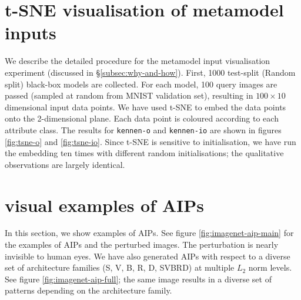 \documentclass{article} %
\newcommand{\OR}{\texttt{kennen-o}\xspace}
\newcommand{\ORIC}{\texttt{kennen-io}\xspace}
\begin{document}
\section{t-SNE visualisation of metamodel inputs}
\label{appendix:tsne}

We describe the detailed procedure for the metamodel input visualisation experiment (discussed in \S\ref{subsec:why-and-how}). First, 1000 test-split (Random split) black-box models are collected. For each model, 100 query images are passed (sampled at random from MNIST validation set), resulting in $100\times 10$ dimensional input data points. We have used t-SNE\citep{tsne} to embed the data points onto the 2-dimensional plane. Each data point is coloured according to each attribute class. The results for \OR and \ORIC are shown in figures \ref{fig:tsne-o} and \ref{fig:tsne-io}. Since t-SNE is sensitive to initialisation, we have run the embedding ten times with different random initialisations; the qualitative observations are largely identical.

\section{visual examples of AIPs}

In this section, we show examples of AIPs. See figure \ref{fig:imagenet-aip-main} for the examples of AIPs and the perturbed images. The perturbation is nearly invisible to human eyes. We have also generated AIPs with respect to a diverse set of architecture families (S, V, B, R, D, SVBRD) at multiple $L_2$ norm levels. See figure \ref{fig:imagenet-aip-full}; the same image results in a diverse set of patterns depending on the architecture family.



\newpage
\end{document}
